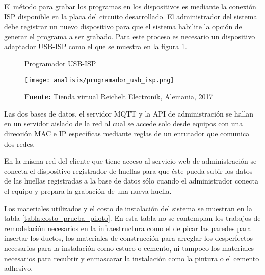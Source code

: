 \documentclass[../principal]{subfiles}
\begin{document}
  El método para grabar los programas en los dispositivos es mediante la conexión ISP disponible en la placa del circuito desarrollado. El administrador del sistema debe registrar un nuevo dispositivo para que el sistema habilite la opción de generar el programa a ser grabado. Para este proceso es necesario un dispositivo adaptador USB-ISP como el que se muestra en la figura \ref{fig:programador_usb_isp}.
  
  \begin{figure}[H]
    \centering
    \caption{Programador USB-ISP}
    \texttt{[image: analisis/programador\_usb\_isp.png]}
    \caption*{\textbf{Fuente:} \href{https://www.reichelt.de/Programmer-Entwicklungstools/DIAMEX-USB-ISP/3/index.html?ACTION=3&GROUPID=2969&ARTICLE=110344&OFFSET=16&SID=12VLdmv38AAAIAABPfxBE17abb04ab6a2ccacf919af2833668124&LANGUAGE=EN}{Tienda virtual Reichelt Electronik, Alemania, 2017}}
    \label{fig:programador_usb_isp}
  \end{figure}

  Las dos bases de datos, el servidor MQTT y la API de administración se hallan en un servidor aislado de la red al cual se accede solo desde equipos con una dirección MAC e IP específicas mediante reglas de un enrutador que comunica dos redes.

  En la misma red del cliente que tiene acceso al servicio web de administración se conecta el dispositivo registrador de huellas para que éste pueda subir los datos de las huellas registradas a la base de datos sólo cuando el administrador conecta el equipo y prepara la grabación de una nueva huella.

  Los materiales utilizados y el costo de instalación del sistema se muestran en la tabla \ref{tabla:costo_prueba_piloto}. En esta tabla no se contemplan los trabajos de remodelación necesarios en la infraestructura como el de picar las paredes para insertar los ductos, los materiales de construcción para arreglar los desperfectos necesarios para la instalación como estuco o cemento, ni tampoco los materiales necesarios para recubrir y enmascarar la instalación como la pintura o el cemento adhesivo.
\end{document}

